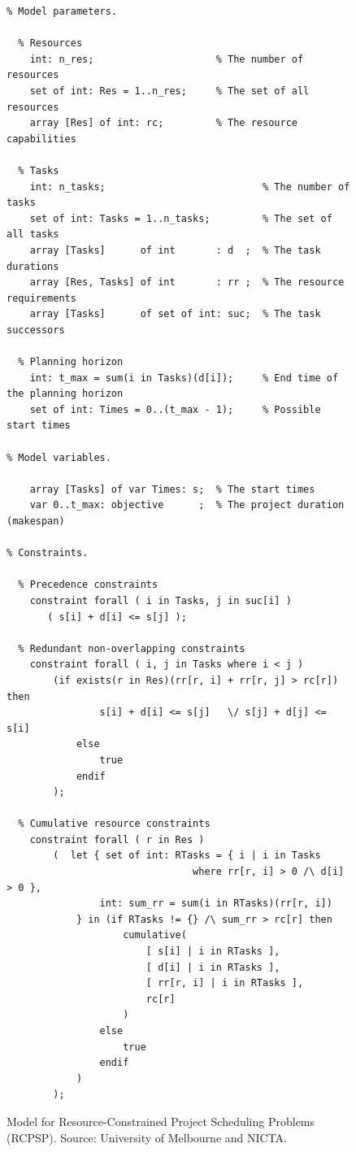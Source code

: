 \begin{figure}
    \begin{lstlisting}
% Model parameters.
 
  % Resources
    int: n_res;                     % The number of resources
    set of int: Res = 1..n_res;     % The set of all resources
    array [Res] of int: rc;         % The resource capabilities
    
  % Tasks
    int: n_tasks;                           % The number of tasks
    set of int: Tasks = 1..n_tasks;         % The set of all tasks
    array [Tasks]      of int       : d  ;  % The task durations
    array [Res, Tasks] of int       : rr ;  % The resource requirements
    array [Tasks]      of set of int: suc;  % The task successors
    
  % Planning horizon
    int: t_max = sum(i in Tasks)(d[i]);     % End time of the planning horizon
    set of int: Times = 0..(t_max - 1);     % Possible start times
    
% Model variables.

    array [Tasks] of var Times: s;  % The start times
    var 0..t_max: objective      ;  % The project duration (makespan)
    
% Constraints.

  % Precedence constraints
    constraint forall ( i in Tasks, j in suc[i] )
       ( s[i] + d[i] <= s[j] );
    
  % Redundant non-overlapping constraints
    constraint forall ( i, j in Tasks where i < j )
        (if exists(r in Res)(rr[r, i] + rr[r, j] > rc[r]) then
                s[i] + d[i] <= s[j]   \/ s[j] + d[j] <= s[i]
            else
                true
            endif
        );
    
  % Cumulative resource constraints
    constraint forall ( r in Res )
        (  let { set of int: RTasks = { i | i in Tasks 
                                where rr[r, i] > 0 /\ d[i] > 0 },
                int: sum_rr = sum(i in RTasks)(rr[r, i])
            } in (if RTasks != {} /\ sum_rr > rc[r] then
                    cumulative(
                        [ s[i] | i in RTasks ],
                        [ d[i] | i in RTasks ],
                        [ rr[r, i] | i in RTasks ],
                        rc[r]
                    )
                else
                    true
                endif
            )
        );
\end{lstlisting}
\caption{Model for Resource-Constrained Project Scheduling Problems (RCPSP). Source: University of Melbourne and NICTA.}
\label{fig:Model-RCPSP-1}
\end{figure}

